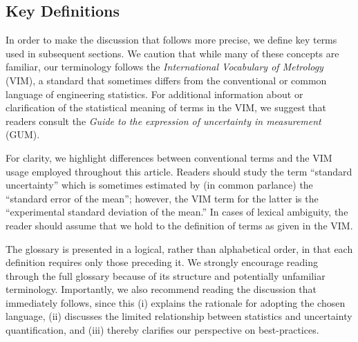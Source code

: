 \subsection{Key Definitions}

In order to make the discussion that follows more precise, we define key terms used in subsequent sections.
We caution that while many of these concepts are familiar, our terminology follows the {\it International Vocabulary of Metrology} (VIM)\citep{JCGM:VIM2012}, a standard that sometimes differs from the conventional or common language of engineering statistics.   For additional information about or clarification of the statistical meaning of terms in the VIM, we suggest that readers consult the {\it Guide to the expression of uncertainty in measurement} (GUM)\citep{JCGM:GUM2008}.

For clarity, we highlight differences between conventional terms and the VIM usage employed throughout this article.
Readers should study the term ``standard uncertainty'' which is sometimes estimated by (in common parlance) the ``standard error of the mean''; however, the VIM term for the latter is the ``experimental standard deviation of the mean.''
In cases of lexical ambiguity, the reader should assume that we hold to the definition of terms as given in the VIM.

The glossary is presented in a logical, rather than alphabetical order, in that each definition requires only those preceding it.  We strongly encourage reading through the full glossary because of its structure and potentially unfamiliar terminology.  Importantly, we also recommend reading the discussion that immediately follows, since this (i) explains the rationale for adopting the chosen language, (ii)  discusses the limited relationship between statistics and uncertainty quantification, and (iii) thereby clarifies our perspective on best-practices. 



